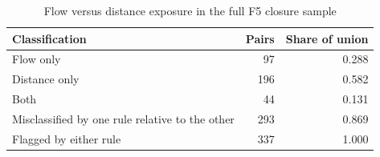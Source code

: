 \begin{table}[!htbp]\centering
\caption{Flow versus distance exposure in the full F5 closure sample}
\label{tab:flow-distance-disagreement-f5}
\small
\begin{tabular}{lrr}
\toprule
Classification & Pairs & Share of union \\
\midrule
Flow only & 97 & 0.288 \\
Distance only & 196 & 0.582 \\
Both & 44 & 0.131 \\
Misclassified by one rule relative to the other & 293 & 0.869 \\
Flagged by either rule & 337 & 1.000 \\
\bottomrule
\end{tabular}
\end{table}
